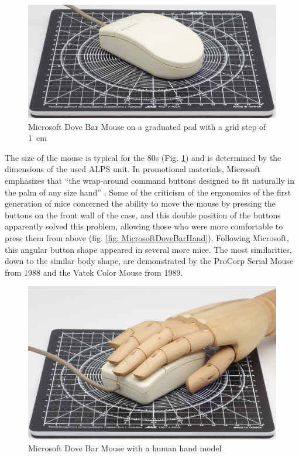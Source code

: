 \documentclass[11pt, a4paper]{article}
\begin{document}
\begin{figure}[h]
    \centering
    \includegraphics[scale=0.5]{1987_microsoft_dove_bar_mouse/size.jpg}
    \caption{Microsoft Dove Bar Mouse on a graduated pad with a grid step of 1~cm}
    \label{fig:MicrosoftDoveBarSize}
\end{figure}

The size of the mouse is typical for the 80s (Fig. \ref{fig:MicrosoftDoveBarSize}) and is determined by the dimensions of the used ALPS unit. In promotional materials, Microsoft emphasizes that ``the wrap-around command buttons designed to fit naturally in the palm of any size hand'' \cite{mouses}. Some of the criticism of the ergonomics of the first generation of mice concerned the ability to move the mouse by pressing the buttons on the front wall of the case, and this double position of the buttons apparently solved this problem, allowing those who were more comfortable to press them from above (fig. \ref{fig: MicrosoftDoveBarHand}). Following Microsoft, this angular button shape appeared in several more mice. The most similarities, down to the similar body shape, are demonstrated by the ProCorp Serial Mouse from 1988 and the Vatek Color Mouse from 1989.

\begin{figure}[h]
    \centering
    \includegraphics[scale=0.5]{1987_microsoft_dove_bar_mouse/hand.jpg}
    \caption{Microsoft Dove Bar Mouse with a human hand model}
    \label{fig:MicrosoftDoveBarHand}
\end{figure}
\end{document}
